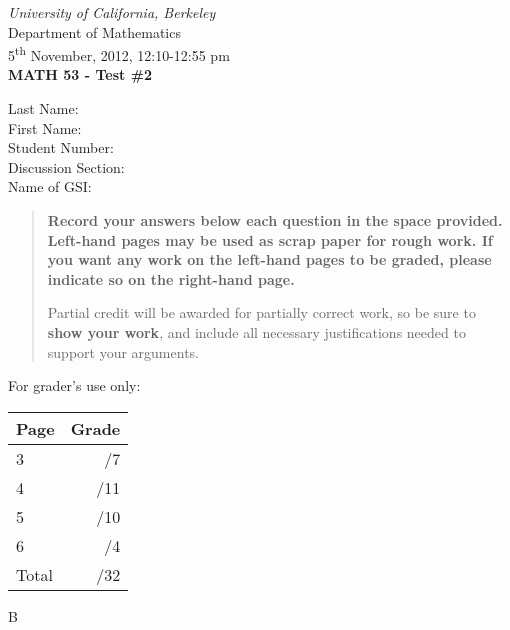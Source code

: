 \documentclass[12pt]{article}
\newcommand{\skipline}{\vspace{12pt}}
\begin{document}
\author{Instructor: Sean Fitzpatrick}
\thispagestyle{plain}
\begin{center}
\emph{University of California, Berkeley}\\
Department of Mathematics\\
5\textsuperscript{th} November, 2012, 12:10-12:55 pm\\
{\bf MATH 53 - Test \#2}\\
\end{center}
\skipline \skipline \skipline \noindent \skipline
Last Name:\underline{\hspace{350pt}}\\
\skipline
First Name:\underline{\hspace{348pt}}\\
\skipline
Student Number:\underline{\hspace{322pt}}\\
\skipline
Discussion Section: \underline{\hspace{307pt}}\\
\skipline
Name of GSI: \underline{\hspace{336pt}}\\

\vspace{0.5in}


\begin{quote}
 {\bf Record your answers below each question in the space provided.    Left-hand pages may be used as scrap paper for rough work.  If you want any work on the left-hand pages to be graded, please indicate so on the right-hand page.
 
 \bigskip
 
Partial credit will be awarded for partially correct work, so be sure to {\bf show your work}, and include all necessary justifications needed to support your arguments.}
\end{quote}


\vspace{0.5in}

For grader's use only:

\begin{table}[hbt]
\begin{center}
\begin{tabular}{|l|r|} \hline
Page&Grade\\
\hline \hline
\cline{1-2} 3 & \enspace\enspace\enspace\enspace\enspace\enspace/7\\
\cline{1-2} 4 & \enspace\enspace\enspace\enspace\enspace\enspace/11\\
\cline{1-2} 5 & \enspace\enspace\enspace\enspace\enspace\enspace/10\\
\cline{1-2} 6 & \enspace\enspace\enspace\enspace\enspace\enspace/4\\
\cline{1-2} Total & \enspace\enspace\enspace\enspace\enspace\enspace/32\\
\hline
\end{tabular}

\skipline

\skipline

\skipline

\skipline

B
\end{center}
\end{table}
\newpage
\end{document}
